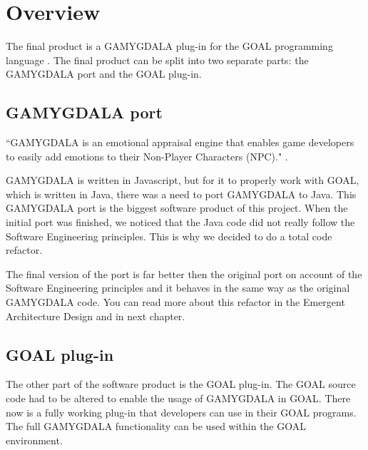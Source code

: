 \section{Overview}
The final product is a GAMYGDALA \citep{gamygdala} plug-in for the GOAL programming language \citep{goal}. The final product can be split into two separate parts: the GAMYGDALA port and the GOAL plug-in.

\subsection{GAMYGDALA port}
``GAMYGDALA is an emotional appraisal engine that enables game developers to easily add emotions to their Non-Player Characters (NPC)." \citep{gamygdala}. \par
GAMYGDALA is written in Javascript, but for it to properly work with GOAL, which is written in Java, there was a need to port GAMYGDALA to Java. This GAMYGDALA port is the biggest software product of this project. When the initial port was finished, we noticed that the Java code did not really follow the Software Engineering principles. This is why we decided to do a total code refactor. \par 
The final version of the port is far better then the original port on account of the Software Engineering principles and it behaves in the same way as the original GAMYGDALA code. You can read more about this refactor in the Emergent Architecture Design \citep{ead} and in next chapter.

\subsection{GOAL plug-in}
The other part of the software product is the GOAL plug-in. The GOAL source code had to be altered to enable the usage of GAMYGDALA in GOAL. There now is a fully working plug-in that developers can use in their GOAL programs. The full GAMYGDALA functionality can be used within the GOAL environment.